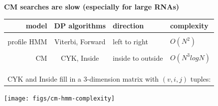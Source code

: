 \documentclass[landscape]{slides}
\begin{document}
\begin{slide}


\vfill

\end{slide}
\begin{slide}
\begin{center}
\textbf{CM searches are slow (especially for large RNAs)}
\end{center}

\small
%

\begin{center}
\begin{tabular}{rcll}
model & DP algorithms & direction & complexity \\ \hline
& & & \\
profile HMM & Viterbi, Forward & left to right     & $O(N^2)$      \\
& & & \\
         CM & CYK, Inside      & inside to outside & $O(N^3logN)$ \\

& & & \\
& & & \\
& & & \\
\multicolumn{4}{l}{CYK and Inside fill in a 3-dimension matrix with
  $(v,i,j)$ tuples:} \\
\end{tabular}

\medskip

\texttt{[image: figs/cm-hmm-complexity]}

\end{center}
\vfill

\end{slide}
\end{document}

